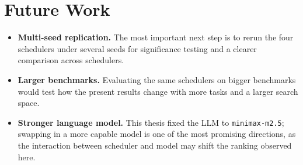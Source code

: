 \section{Future Work}

\begin{itemize}
  \item \textbf{Multi-seed replication.} The most important next step
    is to rerun the four schedulers under several seeds for
    significance testing and a clearer comparison across schedulers.
  \item \textbf{Larger benchmarks.} Evaluating the same schedulers on
    bigger benchmarks would test how the present results change with
    more tasks and a larger search space.
  \item \textbf{Stronger language model.} This thesis fixed the LLM to
    \texttt{minimax-m2.5}; swapping in a more capable model is one of
    the most promising directions, as the interaction between
    scheduler and model may shift the ranking observed here.
\end{itemize}
